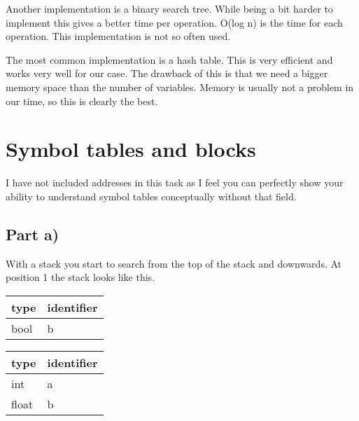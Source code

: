 \documentclass[paper=a4, fontsize=11pt]{scrartcl} %
\numberwithin{equation}{section} %
\numberwithin{figure}{section} %
\numberwithin{table}{section} %
\begin{document}
Another implementation is a binary search tree.
While being a bit harder to implement this gives a better time per operation.
O(log n) is the time for each operation.
This implementation is not so often used.

The most common implementation is a hash table.
This is very efficient and works very well for our case.
The drawback of this is that we need a bigger memory space than the number of variables.
Memory is usually not a problem in our time, so this is clearly the best.
\section{Symbol tables and blocks}
I have not included addresses in this task as I feel you can perfectly show your ability to understand symbol tables conceptually without that field.
\subsection{Part a)}
With a stack you start to search from the top of the stack and downwards. At position 1 the stack looks like this.
\begin{table}[ht!]
    \begin{center}
    \begin{tabular}{| l | l |}
    \hline
    type  & identifier \\
    \hline
    bool   & b          \\
    \hline
    \end{tabular}
    \end{center}
\end{table}
\begin{table}[ht!]
    \begin{center}
    \begin{tabular}{| l | l |}
    \hline
    type  & identifier \\
    \hline
    int   & a          \\
    \hline
    float & b          \\
    \hline
    \end{tabular}
    \end{center}
\end{table}
\end{document}
